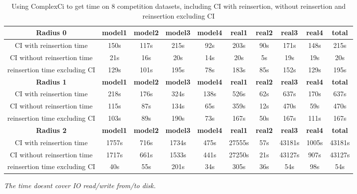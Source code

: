 \documentclass{article}
\begin{document}
	\begin{table}[]
	\begin{adjustwidth}{-2cm}{}		
		\begin{threeparttable}		
			\centering
			\caption{Using ComplexCi to get time on 8 competition datasets, including CI with reinsertion, without reinsertion and reinsertion excluding CI}
			\label{tab:table10}
			\begin{tabular}{|c|c|c|c|c|c|c|c|c|c|}
				\hline
				\textbf{Radius 0} & \textbf{model1} & \textbf{model2} & \textbf{model3} & \textbf{model4} & \textbf{real1} & \textbf{real2} & \textbf{real3} & \textbf{real4} & \textbf{total} \\ \hline
				
				CI with reinsertion time                 & 150s&117s&215s&92s&203s&90s&171s&148s&215s         \\ \hline
				CI without reinsertion time                             & 21s&16s&20s&14s&20s&5s&19s&19s&20s            \\ \hline
				reinsertion time excluding CI                         & 129s&101s&195s&78s&183s&85s&152s&129s&195s               \\ \hline
				
				\textbf{Radius 1} & \textbf{model1} & \textbf{model2} & \textbf{model3} & \textbf{model4} & \textbf{real1} & \textbf{real2} & \textbf{real3} & \textbf{real4} & \textbf{total} \\ \hline
				
				CI with reinsertion time                 & 218s&176s&324s&138s&526s&62s&637s&170s&637s         \\ \hline
				CI without reinsertion time                             & 115s&87s&134s&65s&359s&12s&470s&59s&470s            \\ \hline
				reinsertion time excluding CI                         & 103s&89s&190s&73s&167s&50s&167s&111s&167s               \\ \hline					
				
				\textbf{Radius 2} & \textbf{model1} & \textbf{model2} & \textbf{model3} & \textbf{model4} & \textbf{real1} & \textbf{real2} & \textbf{real3} & \textbf{real4} & \textbf{total} \\ \hline
				CI with reinsertion time                 & 1757s&716s&1734s&475s&27555s&57s&43181s&1005s&43181s         \\ \hline
				CI without reinsertion time                             & 1717s&661s&1533s&441s&27250s&21s&43127s&907s&43127s         \\ \hline
				reinsertion time excluding CI                         & 40s&55s&201s&34s&305s&36s&54s&98s&54s                \\ \hline				
			\end{tabular}
			\begin{tablenotes}
				\small
				\item\textit{ The time doesn\textquotesingle t cover IO read/write from/to disk.}
			\end{tablenotes}			
		\end{threeparttable}
	\end{adjustwidth}	
	\end{table}	
\end{document}
